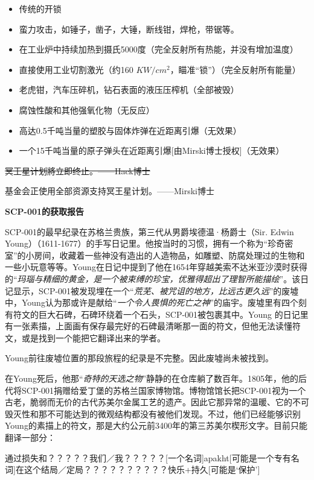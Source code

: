 \documentclass[openany,a4paper]{book} %
\begin{document}
\begin{itemize}
  \item 传统的开锁
  \item 蛮力攻击，如锤子，凿子，大锤，断线钳，焊枪，带锯等。
  \item 在工业炉中持续加热到摄氏5000度（完全反射所有热能，并没有增加温度）
  \item 直接使用工业切割激光（约160 $KW/cm^2$，瞄准“锁”）（完全反射所有能量）
  \item 老虎钳，汽车压碎机，钻石表面的液压压榨机（全部被毁）
  \item 腐蚀性酸和其他强氧化物（无反应）
  \item 高达0.5千吨当量的塑胶与固体炸弹在近距离引爆（无效果）
  \item 一个15千吨当量的原子弹头在近距离引爆[由Mirski博士授权]（无效果）
\end{itemize}

\begin{colorboxed}
\sout{冥王星计划將立即终止。——Hack博士}
\end{colorboxed}

\vspace{12pt}

\begin{colorboxed}
基金会正使用全部资源支持冥王星计划。——Mirski博士
\end{colorboxed}

\clearpage

\textbf{SCP-001的获取报告}\vspace{12pt}

SCP-001的最早纪录在苏格兰贵族，第三代从男爵埃德温·杨爵士（Sir. Edwin Young）（1611-1677）的手写日记里。他按当时的习惯，拥有一个称为“珍奇密室”的小房间，收藏着一些神没有造出的人造物品，如雕塑、防腐处理过的生物和一些小玩意等等。Young在日记中提到了他在1654年穿越美索不达米亚沙漠时获得的“\textit{玛瑙与精细的黄金，是一个被束缚的珍宝，优雅得超出了理智所能描绘}”。该日记显示，SCP-001被发现埋在一个“\textit{荒芜、被咒诅的地方，比远古更久远}”的废墟中，Young认为那或许是献给“\textit{一个令人畏惧的死亡之神}”的庙宇。废墟里有四个刻有符文的巨大石碑，石碑环绕着一个石头，SCP-001被包裹其中。Young 的日记里有一张素描，上面画有保存最完好的石碑最清晰那一面的符文，但他无法读懂符文，或是找到一个能把它翻译出来的学者。\vspace{12pt}

Young前往废墟位置的那段旅程的纪录是不完整。因此废墟尚未被找到。\vspace{12pt}

在Young死后，他那“\textit{奇特的天选之物}”静静的在仓库躺了数百年。1805年，他的后代将SCP-001捐赠给爱丁堡的苏格兰国家博物馆。博物馆馆长把SCP-001视为一个古老，脆弱而无价的古代苏美尔金属工艺的遗产。因此它那异常的温暖、它的不可毁灭性和那不可能达到的微观结构都没有被他们发现。不过，他们已经能够识别Young的素描上的符文，那是大约公元前3400年的第三苏美尔楔形文字。目前只能翻译一部分：
\begin{colorboxed}
通过损失和？？？？？我们／我？？？？？[一个名词]apakht[可能是一个专有名词]在这个结局／定局？？？？？？？？？？快乐+持久[可能是‘保护’]
\end{colorboxed}
\end{document}
